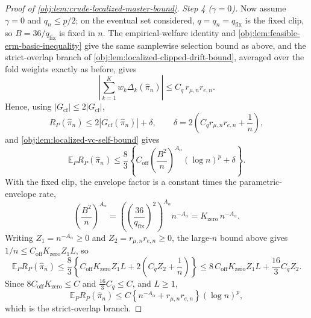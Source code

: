 \documentclass[11pt]{article}
\begin{document}
\begin{proof}[Proof of \cref{obj:lem:crude-localized-master-bound}]
\emph{Step 4 (\(\gamma=0\)).}  Now assume \(\gamma=0\) and \(q_n\le\underline p/2\); on the eventual set considered, \(q=q_n=q_{\mathrm{fix}}\) is the fixed clip, so \(B=36/q_{\mathrm{fix}}\) is fixed in \(n\).  The empirical-welfare identity and \cref{obj:lem:feasible-erm-basic-inequality} give the same samplewise selection bound as above, and the strict-overlap branch of \cref{obj:lem:localized-clipped-drift-bound}, averaged over the fold weights exactly as before, gives
\[
\left|\sum_{k=1}^Kw_k\Delta_k(\widehat\pi_n)\right|
\le C_q\,r_{\mu,n}r_{e,n}.
\]
Hence, using \(|G_{\mathrm{cf}}|\le2|G_{\mathrm{cf}}|\),
\[
R_P(\widehat\pi_n)\le 2\left|G_{\mathrm{cf}}(\widehat\pi_n)\right|+\delta,
\qquad
\delta=2\left(C_q r_{\mu,n}r_{e,n}+\frac1n\right),
\]
and \cref{obj:lem:localized-vc-self-bound} gives
\[
\mathbb E_PR_P(\widehat\pi_n)
\le
\frac83\left\{C_{\mathrm{off}}\left(\frac{B^2}{n}\right)^{A_\alpha}(\log n)^p+\delta\right\}.
\]
With the fixed clip, the envelope factor is a constant times the parametric-envelope rate,
\[
\left(\frac{B^2}{n}\right)^{A_\alpha}
=
\left(\left(\frac{36}{q_{\mathrm{fix}}}\right)^2\right)^{A_\alpha}n^{-A_\alpha}
=
K_{\mathrm{zero}}\,n^{-A_\alpha}.
\]
Writing \(Z_1=n^{-A_\alpha}\ge0\) and \(Z_2=r_{\mu,n}r_{e,n}\ge0\), the large-\(n\) bound above gives \(1/n\le C_{\mathrm{off}}K_{\mathrm{zero}}Z_1L\), so
\[
\mathbb E_PR_P(\widehat\pi_n)
\le
\frac83\left\{C_{\mathrm{off}}K_{\mathrm{zero}}Z_1L+2\left(C_qZ_2+\frac1n\right)\right\}
\le
8\,C_{\mathrm{off}}K_{\mathrm{zero}}Z_1L+\frac{16}3C_qZ_2 .
\]
Since \(8C_{\mathrm{off}}K_{\mathrm{zero}}\le C\) and \(\tfrac{16}3C_q\le C\), and \(L\ge1\),
\[
\mathbb E_P R_P(\widehat\pi_n)
\le
C\left\{
n^{-A_\alpha}+r_{\mu,n}r_{e,n}
\right\}(\log n)^p,
\]
which is the strict-overlap branch. %
\end{proof}
\end{document}
